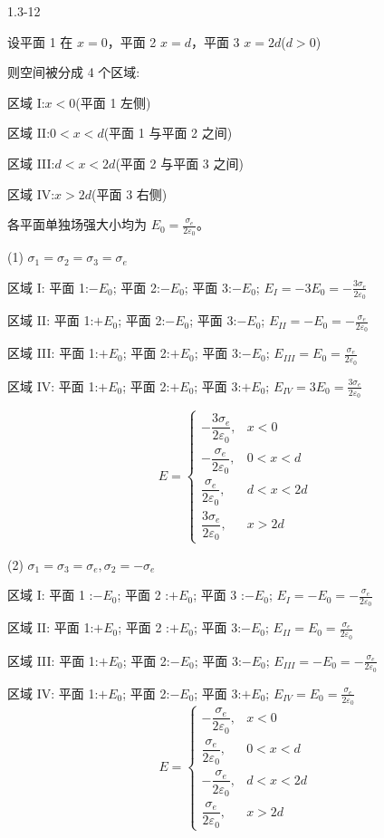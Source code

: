 \documentclass{article}
\begin{document}
1.3-12

设平面 1 在 $x=0$，平面 2  $x=d$，平面 3  $x=2d$($d>0$)

则空间被分成 4 个区域:

区域 I:$x < 0$(平面 1 左侧)

区域 II:$0 < x < d$(平面 1 与平面 2 之间)

区域 III:$d < x < 2d$(平面 2 与平面 3 之间)

区域 IV:$x > 2d$(平面 3 右侧)

各平面单独场强大小均为 $E_0 = \frac{\sigma_e}{2\varepsilon_0}$。

(1) $\sigma_1 = \sigma_2 = \sigma_3 = \sigma_e$

区域 I:
平面 1:$-E_0$;
平面 2:$-E_0$;
平面 3:$-E_0$;
$E_I =-3E_0 = -\frac{3\sigma_e}{2\varepsilon_0}$

区域 II:
平面 1:$+E_0$;
平面 2:$-E_0$;
平面 3:$-E_0$;
$E_{II} =-E_0 = -\frac{\sigma_e}{2\varepsilon_0}$

区域 III:
平面 1:$+E_0$;
平面 2:$+E_0$;
平面 3:$-E_0$;
$E_{III} =E_0 = \frac{\sigma_e}{2\varepsilon_0}$

区域 IV:
平面 1:$+E_0$;
平面 2:$+E_0$;
平面 3:$+E_0$;
$E_{IV}= 3E_0 = \frac{3\sigma_e}{2\varepsilon_0}$

$$E =
\begin{cases}
-\dfrac{3\sigma_e}{2\varepsilon_0}, & x<0 \\[6pt]
-\dfrac{\sigma_e}{2\varepsilon_0}, & 0<x<d \\[6pt]
\dfrac{\sigma_e}{2\varepsilon_0}, & d<x<2d \\[6pt]
\dfrac{3\sigma_e}{2\varepsilon_0}, & x>2d
\end{cases}
$$
 
 (2) $\sigma_1 = \sigma_3 = \sigma_e,\sigma_2 = -\sigma_e$

区域 I:
平面 1 :$-E_0$;
平面 2 :$+E_0$;
平面 3 :$-E_0$;
$E_I =-E_0 = -\frac{\sigma_e}{2\varepsilon_0}$

 区域 II:
平面 1:$+E_0$;
平面 2 :$+E_0$;
平面 3:$-E_0$;
$E_{II} =E_0 = \frac{\sigma_e}{2\varepsilon_0}$

 区域 III:
平面 1:$+E_0$;
平面 2:$-E_0$;
平面 3:$-E_0$;
$E_{III} =-E_0 = -\frac{\sigma_e}{2\varepsilon_0}$

 区域 IV:
平面 1:$+E_0$;
平面 2:$-E_0$;
平面 3:$+E_0$;
$E_{IV} = E_0 = \frac{\sigma_e}{2\varepsilon_0}$
$$
E =
\begin{cases}
-\dfrac{\sigma_e}{2\varepsilon_0}, & x<0 \\[6pt]
\dfrac{\sigma_e}{2\varepsilon_0}, & 0<x<d \\[6pt]
-\dfrac{\sigma_e}{2\varepsilon_0}, & d<x<2d \\[6pt]
\dfrac{\sigma_e}{2\varepsilon_0}, & x>2d
\end{cases}
$$
\end{document}
